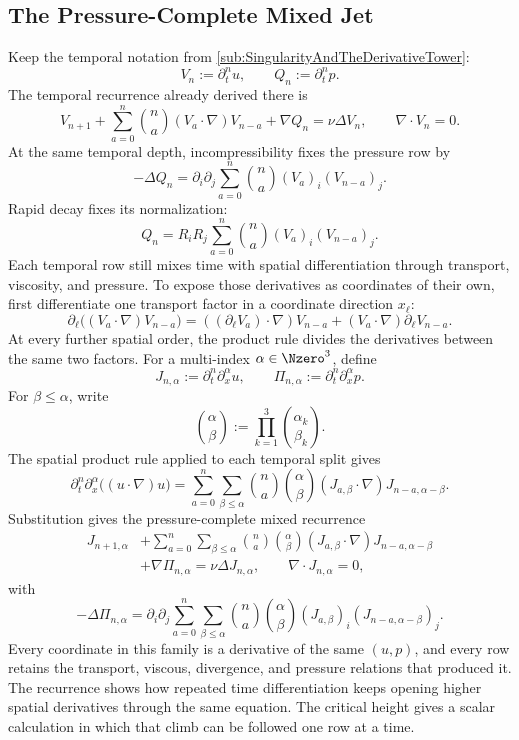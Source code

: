 
\subsection{The Pressure-Complete Mixed Jet}\label{sub:ThePressureCompleteMixedJet}

Keep the temporal notation from \cref{sub:SingularityAndTheDerivativeTower}:
\[
  V_n
  :=
  \partial_t^nu,
  \qquad
  Q_n
  :=
  \partial_t^np.
\]
The temporal recurrence already derived there is
\[
  V_{n+1}
  +
  \sum_{a=0}^{n}
  \binom{n}{a}
  (V_a\cdot\nabla)V_{n-a}
  +\nabla Q_n
  =
  \nu\Delta V_n,
  \qquad
  \nabla\cdot V_n=0.
\]
At the same temporal depth, incompressibility fixes the pressure row by
\[
  -\Delta Q_n
  =
  \partial_i\partial_j
  \sum_{a=0}^{n}
  \binom{n}{a}
  (V_a)_i(V_{n-a})_j.
\]
Rapid decay fixes its normalization:
\[
  Q_n
  =
  R_iR_j
  \sum_{a=0}^{n}
  \binom{n}{a}
  (V_a)_i(V_{n-a})_j.
\]
Each temporal row still mixes time with spatial differentiation through transport, viscosity, and pressure.
To expose those derivatives as coordinates of their own, first differentiate one transport factor in a coordinate direction \(x_\ell\):
\[
  \partial_\ell\bigl((V_a\cdot\nabla)V_{n-a}\bigr)
  =
  ((\partial_\ell V_a)\cdot\nabla)V_{n-a}
  +
  (V_a\cdot\nabla)\partial_\ell V_{n-a}.
\]
At every further spatial order, the product rule divides the derivatives between the same two factors.
For a multi-index \(\alpha\in\Nzero^3\), define
\[
  J_{n,\alpha}
  :=
  \partial_t^n\partial_x^\alpha u,
  \qquad
  \Pi_{n,\alpha}
  :=
  \partial_t^n\partial_x^\alpha p.
\]
For \(\beta\leq\alpha\), write
\[
  \binom{\alpha}{\beta}
  :=
  \prod_{k=1}^{3}
  \binom{\alpha_k}{\beta_k}.
\]
The spatial product rule applied to each temporal split gives
\[
  \partial_t^n\partial_x^\alpha
  \bigl((u\cdot\nabla)u\bigr)
  =
  \sum_{a=0}^{n}
  \sum_{\beta\leq\alpha}
  \binom{n}{a}
  \binom{\alpha}{\beta}
  (J_{a,\beta}\cdot\nabla)
  J_{n-a,\alpha-\beta}.
\]
Substitution gives the pressure-complete mixed recurrence
\begin{align*}
  J_{n+1,\alpha}
  &+
  \sum_{a=0}^{n}
  \sum_{\beta\leq\alpha}
  \binom{n}{a}
  \binom{\alpha}{\beta}
  (J_{a,\beta}\cdot\nabla)
  J_{n-a,\alpha-\beta}
  \\
  &+
  \nabla\Pi_{n,\alpha}
  =
  \nu\Delta J_{n,\alpha},
  \qquad
  \nabla\cdot J_{n,\alpha}=0,
\end{align*}
with
\[
  -\Delta\Pi_{n,\alpha}
  =
  \partial_i\partial_j
  \sum_{a=0}^{n}
  \sum_{\beta\leq\alpha}
  \binom{n}{a}
  \binom{\alpha}{\beta}
  (J_{a,\beta})_i
  (J_{n-a,\alpha-\beta})_j.
\]
Every coordinate in this family is a derivative of the same \((u,p)\), and every row retains the transport, viscous, divergence, and pressure relations that produced it.
The recurrence shows how repeated time differentiation keeps opening higher spatial derivatives through the same equation.
The critical height gives a scalar calculation in which that climb can be followed one row at a time.
